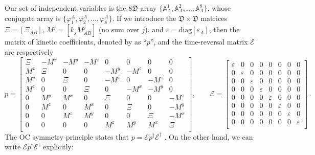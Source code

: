 \documentclass[a4paper, amsfonts, amssymb, amsmath, reprint, showkeys, nofootinbib, twoside, onecolumn,notitlepage]{revtex4-1}
\begin{document}
Our set of independent variables is the $8\mathfrak{D}$-array $\{ \mathbb{A}^1_A,\mathbb{A}^2_A,...,\mathbb{A}^8_A \}$, whose conjugate array is $\{\varphi_1^A,\varphi_2^A,...,\varphi_8^A \}$. If we introduce the $\mathfrak{D}\times\mathfrak{D}$ matrices $\Xi=[\Xi_{AB}]$, $M^j=[k_j M^j_{AB}]$ (no sum over $j$), and $\varepsilon=\text{diag}[\varepsilon_A]$, then the matrix of kinetic coefficients, denoted by \citet{Onsager_Casimir} as ``$p$'', and the time-reversal matrix $\mathcal{E}$ \cite{Krommes1993} are respectively 
\begin{equation}
p = 
\begin{bmatrix}
\Xi & - M^x & - M^y & - M^z & 0 & 0 & 0 & 0\\
 M^x & \Xi  & 0 & 0 & - M^y & - M^z & 0 & 0\\
 M^y & 0 & \Xi  & 0 & - M^x & 0 & - M^z & 0\\
 M^z & 0 & 0 & \Xi  & 0 & - M^x & - M^y & 0\\
0 &  M^y & M^x & 0 & \Xi  & 0 & 0 & - M^z \\
0 &  M^z & 0 &  M^x & 0 & \Xi  & 0 & - M^y\\
0 & 0 &  M^z &  M^y & 0 & 0 & \Xi  & - M^x\\
0 & 0 & 0 & 0 &  M^z &  M^y &  M^x & \Xi \\
\end{bmatrix}, \quad \quad 
\mathcal{E}=
\begin{bmatrix}
\varepsilon & 0 & 0 & 0 & 0 & 0 & 0 & 0 \\
0 & \varepsilon & 0 & 0 & 0 & 0 & 0 & 0 \\
0 & 0 & \varepsilon & 0 & 0 & 0 & 0 & 0 \\
0 & 0 & 0 & \varepsilon & 0 & 0 & 0 & 0 \\
0 & 0 & 0 & 0 & \varepsilon & 0 & 0 & 0 \\
0 & 0 & 0 & 0 & 0 & \varepsilon & 0 & 0 \\
0 & 0 & 0 & 0 & 0 & 0 & \varepsilon & 0 \\
0 & 0 & 0 & 0 & 0 & 0 & 0 & \varepsilon \\
\end{bmatrix} \, .
\end{equation}
The OC symmetry principle states that $p=\mathcal{E}p^\dagger\mathcal{E}^\dagger$ \cite{Krommes1993}. On the other hand, we can write $\mathcal{E}p^\dagger\mathcal{E}^\dagger$ explicitly:
\end{document}
